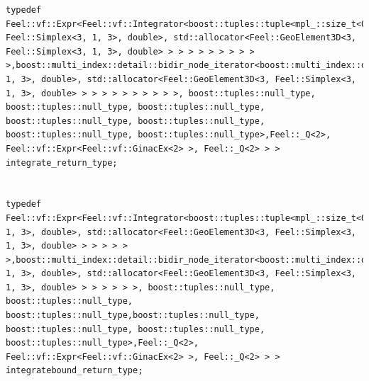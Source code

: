 \documentclass[french,12pt]{article}
\begin{document}
\begin{lstlisting}
typedef Feel::vf::Expr<Feel::vf::Integrator<boost::tuples::tuple<mpl_::size_t<0>,boost::multi_index::detail::bidir_node_iterator<boost::multi_index::detail::ordered_index_node<boost::multi_index::detail::ordered_index_node<boost::multi_index::detail::ordered_index_node<boost::multi_index::detail::ordered_index_node<boost::multi_index::detail::ordered_index_node<boost::multi_index::detail::ordered_index_node<boost::multi_index::detail::ordered_index_node<boost::multi_index::detail::index_node_base<Feel::GeoElement3D<3, Feel::Simplex<3, 1, 3>, double>, std::allocator<Feel::GeoElement3D<3, Feel::Simplex<3, 1, 3>, double> > > > > > > > > > >,boost::multi_index::detail::bidir_node_iterator<boost::multi_index::detail::ordered_index_node<boost::multi_index::detail::ordered_index_node<boost::multi_index::detail::ordered_index_node<boost::multi_index::detail::ordered_index_node<boost::multi_index::detail::ordered_index_node<boost::multi_index::detail::ordered_index_node<boost::multi_index::detail::ordered_index_node<boost::multi_index::detail::index_node_base<Feel::GeoElement3D<3,Feel::Simplex<3, 1, 3>, double>, std::allocator<Feel::GeoElement3D<3, Feel::Simplex<3, 1, 3>, double> > > > > > > > > > >, boost::tuples::null_type, boost::tuples::null_type, boost::tuples::null_type, boost::tuples::null_type, boost::tuples::null_type, boost::tuples::null_type, boost::tuples::null_type>,Feel::_Q<2>, Feel::vf::Expr<Feel::vf::GinacEx<2> >, Feel::_Q<2> > >  integrate_return_type;


typedef Feel::vf::Expr<Feel::vf::Integrator<boost::tuples::tuple<mpl_::size_t<0>,boost::multi_index::detail::bidir_node_iterator<boost::multi_index::detail::ordered_index_node<boost::multi_index::detail::ordered_index_node<boost::multi_index::detail::ordered_index_node<boost::multi_index::detail::index_node_base<Feel::GeoElement3D<3,Feel::Simplex<3, 1, 3>, double>, std::allocator<Feel::GeoElement3D<3, Feel::Simplex<3, 1, 3>, double> > > > > > >,boost::multi_index::detail::bidir_node_iterator<boost::multi_index::detail::ordered_index_node<boost::multi_index::detail::ordered_index_node<boost::multi_index::detail::ordered_index_node<boost::multi_index::detail::index_node_base<Feel::GeoElement3D<3,Feel::Simplex<3, 1, 3>, double>, std::allocator<Feel::GeoElement3D<3, Feel::Simplex<3, 1, 3>, double> > > > > > >, boost::tuples::null_type, boost::tuples::null_type, boost::tuples::null_type,boost::tuples::null_type, boost::tuples::null_type, boost::tuples::null_type, boost::tuples::null_type>,Feel::_Q<2>, Feel::vf::Expr<Feel::vf::GinacEx<2> >, Feel::_Q<2> > > integratebound_return_type;



\end{lstlisting}
\end{document}
